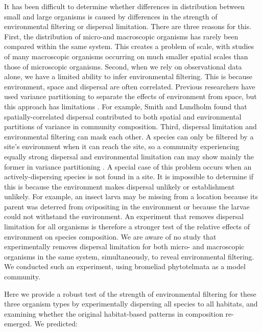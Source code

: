 It has been difficult to determine whether differences in distribution
between small and large organisms is caused by differences in the
strength of environmental filtering or dispersal limitation. There are
three reasons for this. First, the distribution of micro-and macroscopic
organisms has rarely been compared within the same system. This creates
a problem of scale, with studies of many macroscopic organisms occurring
on much smaller spatial scales than those of microscopic organisms.
Second, when we rely on observational data alone, we have a limited
ability to infer environmental filtering. This is because environment,
space and dispersal are often correlated. Previous researchers have used
variance partitioning to separate the effects of environment from space,
but this approach has limitations \citep{Gilbert2010}. For example,
Smith and Lundholm \citeyearpar{Smith2010} found that
spatially-correlated dispersal contributed to both spatial and
environmental partitions of variance in community composition. Third,
dispersal limitation and environmental filtering can mask each other. A
species can only be filtered by a site's environment when it can reach
the site, so a community experiencing equally strong dispersal and
environmental limitation can may show mainly the former in variance
partitioning \citep{Smith2010, DeBie2012a}. A special case of this
problem occurs when an actively-dispersing species is not found in a
site. It is impossible to determine if this is because the environment
makes dispersal unlikely or establishment unlikely. For example, an
insect larva may be missing from a location because its parent was
deterred from ovipositing in the environment or because the larvae could
not withstand the environment. An experiment that removes dispersal
limitation for all organisms is therefore a stronger test of the
relative effects of environment on species composition. We are aware of
no study that experimentally removes dispersal limitation for both
micro- and macroscopic organisms in the same system, simultaneously, to
reveal environmental filtering. We conducted such an experiment, using
bromeliad phytotelmata as a model community.

Here we provide a robust test of the strength of environmental filtering
for these three organism types by experimentally dispersing all species
to all habitats, and examining whether the original habitat-based
patterns in composition re-emerged. We predicted:

